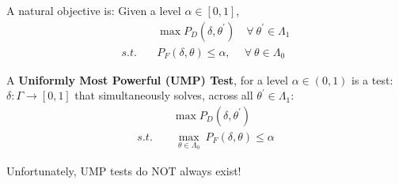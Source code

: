 \documentclass[12pt]{report}
\begin{document}
\noindent A natural objective is: Given a level $\alpha \in [0,1]$,
\begin{align}
    &\max P_D(\delta,\theta^\prime) \quad \forall\ \theta^\prime \in \Lambda_1 \nonumber \\
    s.t.\quad &P_F(\delta,\theta)\leq \alpha,\ \quad \forall\ \theta \in \Lambda_0
\end{align}

\begin{defn}
A \textbf{Uniformly Most Powerful (UMP) Test}, for a level $\alpha \in  (0,1)$ is a test:
$\delta: \Gamma \to [0, 1]$
that simultaneously solves, across all $\theta^\prime \in \Lambda_1$:
\begin{align}
    &\max P_D(\delta,\theta^\prime) \nonumber \\
    s.t.\quad &\ \underset{\theta \in \Lambda_0}{\max}\ P_F(\delta,\theta)\leq \alpha
\end{align}
\end{defn}

\begin{note}
Unfortunately, UMP tests do NOT always exist!
\end{note}
\end{document}
